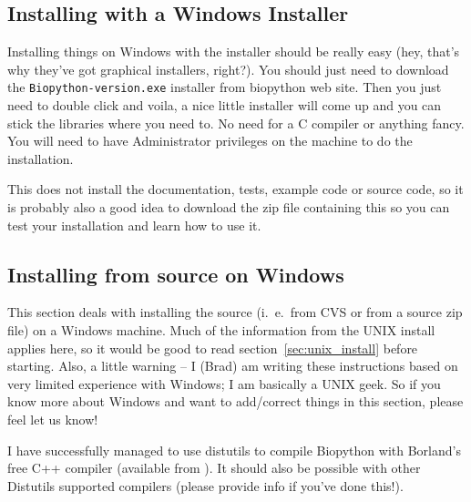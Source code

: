 \documentclass{article}
\begin{document}
\subsection{Installing with a Windows Installer}

Installing things on Windows with the installer should be really easy (hey, that's why they've got graphical installers, right?). You should just need to download the \verb|Biopython-version.exe| installer from biopython web site. Then you just need to double click and voila, a nice little installer will come up and you can stick the libraries where you need to. No need for a C compiler or anything fancy. You will need to have Administrator privileges on the machine to do the installation.


This does not install the documentation, tests, example code or source code, so it is probably also a good idea to download the zip file containing this so you can test your installation and learn how to use it.

\subsection{Installing from source on Windows}
\label{sec:windows_install}

This section deals with installing the source (i.~e.~from CVS or from a source zip file) on a Windows machine. Much of the information from the UNIX install applies here, so it would be good to read section~\ref{sec:unix_install} before starting. Also, a little warning -- I (Brad) am writing these instructions based on very limited experience with Windows; I am basically a UNIX geek. So if you know more about Windows and want to add/correct things in this section, please feel let us know!


I have successfully managed to use distutils to compile Biopython with Borland's free C++ compiler (available from ). It should also be possible with other Distutils supported compilers (please provide info if you've done this!).
\end{document}
